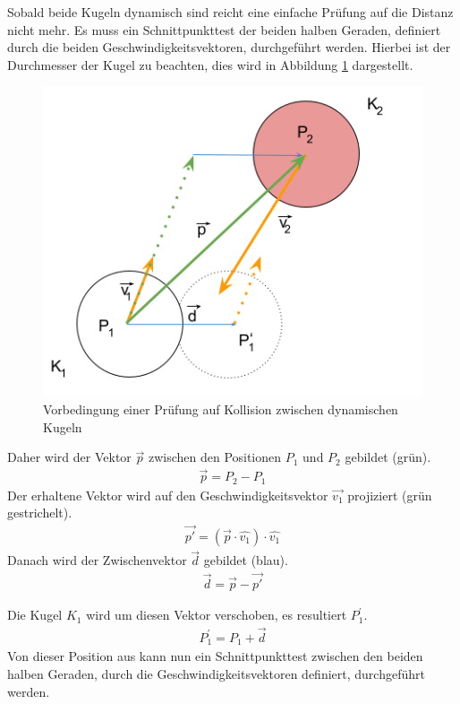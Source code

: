 Sobald beide Kugeln dynamisch sind reicht eine einfache Prüfung auf die Distanz nicht mehr. Es muss ein Schnittpunkttest der beiden halben Geraden, definiert durch die
beiden Geschwindigkeitsvektoren, durchgeführt werden. Hierbei ist der Durchmesser der Kugel zu beachten, dies
wird in Abbildung \ref{fig:kugelkollision_vorbedingung_dynamisch} dargestellt.
\begin{figure}[h!]
    \begin{center}
        \includegraphics[width=0.4\linewidth]{../common/03_billiard_ai/resources/25_vorbedingung_kugelkollision_dynamisch.png}
    \end{center}
    \caption{Vorbedingung einer Prüfung auf Kollision zwischen dynamischen Kugeln}
    \label{fig:kugelkollision_vorbedingung_dynamisch}
\end{figure}

Daher wird der Vektor $\vec{p}$ zwischen den Positionen $P_1$ und $P_2$ gebildet (grün).
\begin{align}
    \vec{p} = P_2 - P_1
\end{align}
Der erhaltene Vektor wird auf den Geschwindigkeitsvektor $\vec{v_1}$ projiziert (grün gestrichelt).
\begin{align}
    \vec{p'} = (\vec{p} \cdot \hat{v_1}) \cdot \hat{v_1}
\end{align}
Danach wird der Zwischenvektor $\vec{d}$ gebildet (blau).
\begin{align}
    \vec{d} = \vec{p} - \vec{p'}
\end{align}

Die Kugel $K_1$ wird um diesen Vektor verschoben, es resultiert $P^{'}_1$.
\begin{align}
    P^{'}_1 = P_1 + \vec{d}
\end{align}
Von dieser Position aus kann nun ein Schnittpunkttest zwischen den beiden
halben Geraden, durch die Geschwindigkeitsvektoren definiert, durchgeführt werden.

